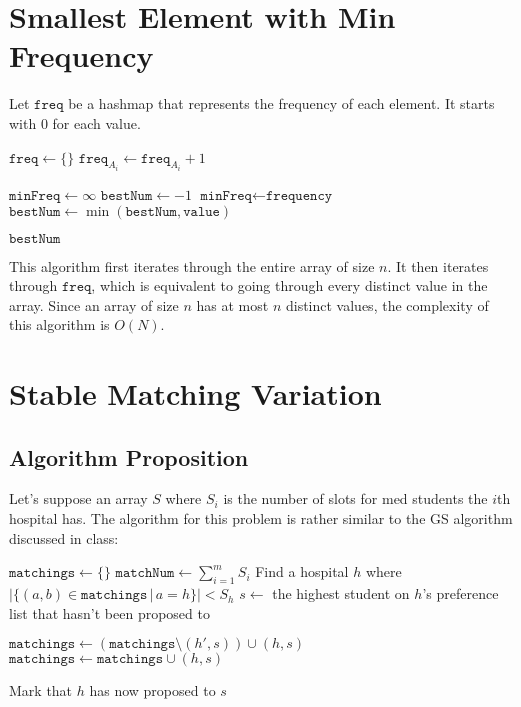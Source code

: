 \documentclass[12pt]{article}
\begin{document}
\section{Smallest Element with Min Frequency}

Let $\texttt{freq}$ be a hashmap that represents the frequency of each element.
It starts with $0$ for each value.

\begin{algorithmic}[1]
    \State $\texttt{freq} \gets \{\}$
    \State $\texttt{freq}_{A_i} \gets \texttt{freq}_{A_i} + 1$
    \EndFor

    \State $\texttt{minFreq} \gets \infty$
    \State $\texttt{bestNum} \gets -1$
    \State $\texttt{minFreq} \gets \texttt{frequency}$
    \State $\texttt{bestNum} \gets \min(\texttt{bestNum}, \texttt{value})$
    \EndIf
    \EndFor

    \State \Return $\texttt{bestNum}$
\end{algorithmic}

This algorithm first iterates through the entire array of size $n$.
It then iterates through $\texttt{freq}$, which is equivalent to going through
every distinct value in the array.
Since an array of size $n$ has at most $n$ distinct values,
the complexity of this algorithm is $O(N)$.

\section{Stable Matching Variation}

\subsection*{Algorithm Proposition}

Let's suppose an array $S$ where $S_i$ is the number of slots for med students
the $i$th hospital has.
The algorithm for this problem is rather similar to the GS algorithm discussed in class:
\begin{algorithmic}[1]
    \State $\texttt{matchings} \gets \{\}$
    \State $\texttt{matchNum} \gets \sum_{i=1}^{m} S_i$
    \State Find a hospital $h$ where $|\{(a, b) \in \texttt{matchings}\,|\,a = h\}| < S_h$
    \State $s \gets$ the highest student on $h$'s preference list that hasn't been proposed to
    \item[]
    \State $\texttt{matchings} \gets (\texttt{matchings} \setminus (h', s)) \cup (h, s)$
    \EndIf
    \Else
    \State $\texttt{matchings} \gets \texttt{matchings} \cup (h, s)$
    \EndIf
    \item[]
    \State Mark that $h$ has now proposed to $s$
    \EndWhile
\end{algorithmic}
\end{document}
